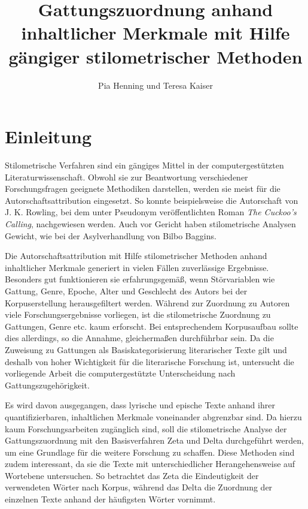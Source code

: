 \documentclass[a4paper,10p]{article}
\begin{document}
	

\thispagestyle{empty}
\newpage

\title{Gattungszuordnung anhand inhaltlicher Merkmale mit Hilfe gängiger stilometrischer Methoden}
\author{Pia Henning und Teresa Kaiser}
\maketitle
\newpage
\tableofcontents
\newpage
\listoffigures

\newpage
{}
\setcounter{page}{1}


\section{Einleitung}
Stilometrische Verfahren sind ein gängiges Mittel in der computergestützten Literaturwissenschaft. Obwohl sie zur Beantwortung verschiedener Forschungsfragen geeignete Methodiken darstellen, werden sie meist für die Autorschaftsattribution eingesetzt. So konnte beispielsweise die Autorschaft von J. K. Rowling, bei dem unter Pseudonym veröffentlichten Roman \emph{The Cuckoo's Calling}, nachgewiesen werden. Auch vor Gericht haben stilometrische Analysen Gewicht, wie bei der Asylverhandlung von \glqq Bilbo Baggins\grqq \citep{Juola2015}.

Die Autorschaftsattribution mit Hilfe stilometrischer Methoden anhand inhaltlicher Merkmale generiert in vielen Fällen zuverlässige Ergebnisse. Besonders gut funktionieren sie erfahrungsgemäß, wenn Störvariablen wie Gattung, Genre, Epoche, Alter und Geschlecht des Autors bei der Korpuserstellung herausgefiltert werden. Während zur Zuordnung zu Autoren viele Forschungsergebnisse vorliegen, ist die stilometrische Zuordnung zu Gattungen, Genre etc. kaum erforscht. Bei ent\-sprech\-en\-dem Korpusaufbau sollte dies allerdings, so die Annahme, gleichermaßen durchführbar sein. Da die Zuweisung zu Gattungen als Basiskategorisierung literarischer Texte gilt und deshalb von hoher Wichtigkeit für die literarische Forschung ist, untersucht die vorliegende Arbeit die computergestützte Unterscheidung nach Gattungszugehörigkeit. 

Es wird davon ausgegangen, dass lyrische und epische Texte anhand ihrer quantifizierbaren, inhaltlichen Merkmale voneinander abgrenzbar sind. Da hierzu kaum Forschungsarbeiten zugänglich sind, soll die stilometrische Analyse der Gattungszuordnung mit den Basisverfahren Zeta und Delta durchgeführt werden, um eine Grundlage für die weitere Forschung zu schaffen. Diese Methoden sind zudem interessant, da sie die Texte mit unterschiedlicher Herangehensweise auf Wortebene untersuchen. So betrachtet das Zeta die Eindeutigkeit der verwendeten Wörter nach Korpus, während das Delta die Zuordnung der einzelnen Texte anhand der häufigsten Wörter vornimmt. 
\end{document}
